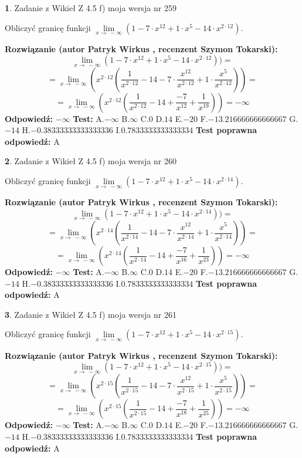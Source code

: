 \documentclass[12pt, a4paper]{article}
\theoremstyle{definition} %
\newtheorem{zad}{}
\newcommand{\zadStart}[1]{\begin{zad}#1\newline}
\newcommand{\zadStop}{\end{zad}}
\newcommand{\rozwStart}[2]{\noindent \textbf{Rozwiązanie (autor #1 , recenzent #2): }\newline}
\newcommand{\rozwStop}{\newline}
\newcommand{\odpStart}{\noindent \textbf{Odpowiedź:}\newline}
\newcommand{\odpStop}{\newline}
\newcommand{\testStart}{\noindent \textbf{Test:}\newline}
\newcommand{\testStop}{\newline}
\newcommand{\kluczStart}{\noindent \textbf{Test poprawna odpowiedź:}\newline}
\newcommand{\kluczStop}{\newline}
\begin{document}
\zadStart{Zadanie z Wikieł Z 4.5 f) moja wersja nr 259}


Obliczyć granicę funkcji  $\lim\limits_{x\to\ -\infty}(1 - 7 \cdot x^{12}+1 \cdot x^{5}- 14 \cdot x^{2\cdot12})$.
\zadStop
\rozwStart{Patryk Wirkus}{Szymon Tokarski}
$$\lim\limits_{x\to\ -\infty}(1 - 7 \cdot x^{12}+1 \cdot x^{5}- 14 \cdot x^{2\cdot12}))=$$
$$=\lim\limits_{x\to\ -\infty}(x^{2\cdot12}(\frac{1}{x^{2\cdot12}}-14 -7 \cdot \frac{x^{12}}{x^{2\cdot12}}+1 \cdot \frac{x^{5}}{x^{2\cdot12}}))=$$
$$=\lim\limits_{x\to\ -\infty}(x^{2\cdot12}(\frac{1}{x^{2\cdot12}}-14 + \frac{-7}{x^{12}}+ \frac{1}{x^{19}}))=-\infty$$
\rozwStop
\odpStart
$-\infty$
\odpStop
\testStart
A.$-\infty$ B.$\infty$ C.$0$ D.$14$ E.$-20$
F.$-13.216666666666667$ G.$-14$
H.$-0.38333333333333336$
I.$0.7833333333333334$
\testStop
\kluczStart
A
\kluczStop



\zadStart{Zadanie z Wikieł Z 4.5 f) moja wersja nr 260}


Obliczyć granicę funkcji  $\lim\limits_{x\to\ -\infty}(1 - 7 \cdot x^{12}+1 \cdot x^{5}- 14 \cdot x^{2\cdot14})$.
\zadStop
\rozwStart{Patryk Wirkus}{Szymon Tokarski}
$$\lim\limits_{x\to\ -\infty}(1 - 7 \cdot x^{12}+1 \cdot x^{5}- 14 \cdot x^{2\cdot14}))=$$
$$=\lim\limits_{x\to\ -\infty}(x^{2\cdot14}(\frac{1}{x^{2\cdot14}}-14 -7 \cdot \frac{x^{12}}{x^{2\cdot14}}+1 \cdot \frac{x^{5}}{x^{2\cdot14}}))=$$
$$=\lim\limits_{x\to\ -\infty}(x^{2\cdot14}(\frac{1}{x^{2\cdot14}}-14 + \frac{-7}{x^{16}}+ \frac{1}{x^{23}}))=-\infty$$
\rozwStop
\odpStart
$-\infty$
\odpStop
\testStart
A.$-\infty$ B.$\infty$ C.$0$ D.$14$ E.$-20$
F.$-13.216666666666667$ G.$-14$
H.$-0.38333333333333336$
I.$0.7833333333333334$
\testStop
\kluczStart
A
\kluczStop



\zadStart{Zadanie z Wikieł Z 4.5 f) moja wersja nr 261}


Obliczyć granicę funkcji  $\lim\limits_{x\to\ -\infty}(1 - 7 \cdot x^{12}+1 \cdot x^{5}- 14 \cdot x^{2\cdot15})$.
\zadStop
\rozwStart{Patryk Wirkus}{Szymon Tokarski}
$$\lim\limits_{x\to\ -\infty}(1 - 7 \cdot x^{12}+1 \cdot x^{5}- 14 \cdot x^{2\cdot15}))=$$
$$=\lim\limits_{x\to\ -\infty}(x^{2\cdot15}(\frac{1}{x^{2\cdot15}}-14 -7 \cdot \frac{x^{12}}{x^{2\cdot15}}+1 \cdot \frac{x^{5}}{x^{2\cdot15}}))=$$
$$=\lim\limits_{x\to\ -\infty}(x^{2\cdot15}(\frac{1}{x^{2\cdot15}}-14 + \frac{-7}{x^{18}}+ \frac{1}{x^{25}}))=-\infty$$
\rozwStop
\odpStart
$-\infty$
\odpStop
\testStart
A.$-\infty$ B.$\infty$ C.$0$ D.$14$ E.$-20$
F.$-13.216666666666667$ G.$-14$
H.$-0.38333333333333336$
I.$0.7833333333333334$
\testStop
\kluczStart
A
\kluczStop
\end{document}
